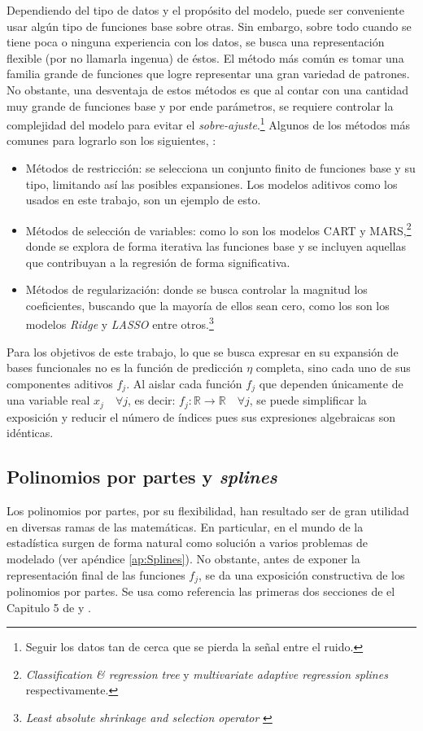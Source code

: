 \documentclass[../Main/Main.tex]{subfiles}
\begin{document}
Dependiendo del tipo de datos y el propósito del modelo, puede ser conveniente usar algún tipo de funciones base sobre otras. Sin embargo, sobre todo cuando se tiene poca o ninguna experiencia con los datos, se busca una representación flexible (por no llamarla ingenua) de éstos. El método más común es tomar una familia grande de funciones que logre representar una gran variedad de patrones. No obstante, una desventaja de estos métodos es que al contar con una cantidad muy grande de funciones base y por ende parámetros, se requiere controlar la complejidad del modelo para evitar el \textit{sobre-ajuste}.\footnote{Seguir los datos tan de cerca que se pierda la señal entre el ruido.} Algunos de los métodos más comunes para lograrlo son los siguientes, \citet{hastie2008elements}:
\begin{itemize}[label={}]
	\item Métodos de restricción: se selecciona un conjunto finito de funciones base y su tipo, limitando así las posibles expansiones. Los modelos aditivos como los usados en este trabajo, son un ejemplo de esto.  
	\item Métodos de selección de variables: como lo son los modelos CART y MARS,\footnote{\textit{Classification \& regression tree} \autocite{breiman1984classification} y \textit{multivariate adaptive regression splines} \autocite{friedman1991multivariate} respectivamente.} donde se explora de forma iterativa las funciones base y se incluyen aquellas que contribuyan a la regresión de forma significativa.
	\item Métodos de regularización: donde se busca controlar la magnitud los coeficientes, buscando que la mayoría de ellos sean cero, como los son los modelos \textit{Ridge} y  \textit{LASSO} entre otros.\footnote{\textit{Least absolute shrinkage and selection operator} \autocite{hoerl1970ridge, tibshirani1996regression}}
\end{itemize}

Para los objetivos de este trabajo, lo que se busca expresar en su expansión de bases funcionales no es la función de predicción $\eta$ completa, sino cada uno de sus componentes aditivos $f_j$. Al aislar cada función $f_j$ que dependen únicamente de una variable real $x_j \quad \forall j$, es decir: $f_j:\mathbb{R}\rightarrow\mathbb{R} \quad \forall j$, se puede simplificar la exposición y reducir el número de índices pues sus expresiones algebraicas son idénticas.

\subsection{Polinomios por partes y \textit{splines}} \label{sec:PolisYSplines}
Los polinomios por partes, por su flexibilidad, han resultado ser de gran utilidad en diversas ramas de las matemáticas. En particular, en el mundo de la estadística surgen de forma natural como solución a varios problemas de modelado (ver apéndice \ref{ap:Splines}). No obstante, antes de exponer la representación final de las funciones $f_j$, se da una exposición constructiva de los polinomios por partes. Se usa como referencia las primeras dos secciones de el Capitulo 5 de \citet{hastie2008elements} y \citet{wahba1990splines}. 
\end{document}
